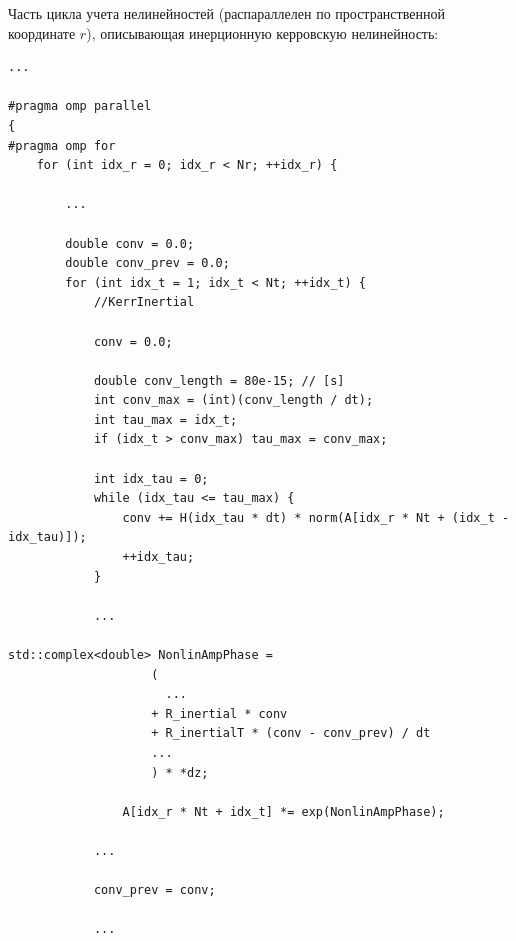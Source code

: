\documentclass[a4paper]{article}
\begin{document}
\noindent Часть цикла учета нелинейностей (распараллелен по пространственной координате $r$), описывающая инерционную керровскую нелинейность:
\begin{lstlisting}
...

#pragma omp parallel 
{
#pragma omp for 
	for (int idx_r = 0; idx_r < Nr; ++idx_r) {
		
		...		
		
		double conv = 0.0;
		double conv_prev = 0.0;
		for (int idx_t = 1; idx_t < Nt; ++idx_t) {	
			//KerrInertial
			
			conv = 0.0;
		
			double conv_length = 80e-15; // [s]
			int conv_max = (int)(conv_length / dt);
			int tau_max = idx_t;
			if (idx_t > conv_max) tau_max = conv_max;

			int idx_tau = 0;
			while (idx_tau <= tau_max) {
				conv += H(idx_tau * dt) * norm(A[idx_r * Nt + (idx_t - idx_tau)]);
				++idx_tau;
			}
			
			...
			
std::complex<double> NonlinAmpPhase =
					(
					  ...
					+ R_inertial * conv 
					+ R_inertialT * (conv - conv_prev) / dt
					...
					) * *dz;

				A[idx_r * Nt + idx_t] *= exp(NonlinAmpPhase);	
				
			...
			
			conv_prev = conv;		
			
			...
			
\end{lstlisting}
\end{document}
